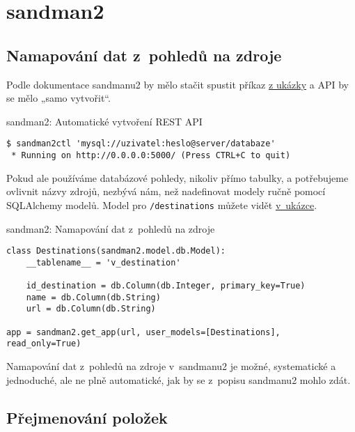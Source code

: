 \section{sandman2}\label{sandman2}

\subsection{Namapování dat z~pohledů na zdroje}\label{namapovuxe1nuxed-dat-z-pohledux16f-na-zdroje}

Podle dokumentace sandmanu2 \autocite{sandman} by mělo stačit spustit příkaz \protect\hyperlink{code:sandman2:command}{z ukázky} a API by se mělo „samo vytvořit“.

\begin{listing}[htbp]
\caption{{\label{code:sandman2:command}sandman2: Automatické vytvoření REST API}}
\begin{verbatim}
$ sandman2ctl 'mysql://uzivatel:heslo@server/databaze'
 * Running on http://0.0.0.0:5000/ (Press CTRL+C to quit)
\end{verbatim}
\end{listing}

Pokud ale používáme databázové pohledy, nikoliv přímo tabulky, a potřebujeme ovlivnit názvy zdrojů, nezbývá nám, než nadefinovat modely ručně pomocí SQLAlchemy modelů. Model pro \verb!/destinations! můžete vidět \protect\hyperlink{code:sandman2:mapping}{v~ukázce}.

\begin{listing}[htbp]
\caption{{\label{code:sandman2:mapping}sandman2: Namapování dat z~pohledů na zdroje}}
\begin{verbatim}
class Destinations(sandman2.model.db.Model):
    __tablename__ = 'v_destination'

    id_destination = db.Column(db.Integer, primary_key=True)
    name = db.Column(db.String)
    url = db.Column(db.String)

app = sandman2.get_app(url, user_models=[Destinations], read_only=True)
\end{verbatim}
\end{listing}

Namapování dat z~pohledů na zdroje v~sandmanu2 je možné, systematické a jednoduché, ale ne plně automatické, jak by se z~popisu sandmanu2 mohlo zdát.

\subsection{Přejmenování položek}\label{pux159ejmenovuxe1nuxed-poloux17eek}

